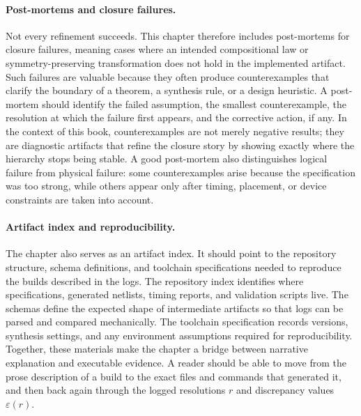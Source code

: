 \documentclass[11pt]{article}
\begin{document}
\paragraph{Post-mortems and closure failures.}
Not every refinement succeeds. This chapter therefore includes post-mortems for closure failures, meaning cases where an intended compositional law or symmetry-preserving transformation does not hold in the implemented artifact. Such failures are valuable because they often produce counterexamples that clarify the boundary of a theorem, a synthesis rule, or a design heuristic. A post-mortem should identify the failed assumption, the smallest counterexample, the resolution at which the failure first appears, and the corrective action, if any. In the context of this book, counterexamples are not merely negative results; they are diagnostic artifacts that refine the closure story by showing exactly where the hierarchy stops being stable. A good post-mortem also distinguishes logical failure from physical failure: some counterexamples arise because the specification was too strong, while others appear only after timing, placement, or device constraints are taken into account.

\paragraph{Artifact index and reproducibility.}
The chapter also serves as an artifact index. It should point to the repository structure, schema definitions, and toolchain specifications needed to reproduce the builds described in the logs. The repository index identifies where specifications, generated netlists, timing reports, and validation scripts live. The schemas define the expected shape of intermediate artifacts so that logs can be parsed and compared mechanically. The toolchain specification records versions, synthesis settings, and any environment assumptions required for reproducibility. Together, these materials make the chapter a bridge between narrative explanation and executable evidence. A reader should be able to move from the prose description of a build to the exact files and commands that generated it, and then back again through the logged resolutions \(r\) and discrepancy values \(\varepsilon(r)\).
\end{document}
